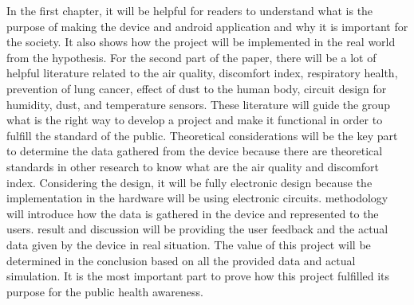 In the first chapter, it will be helpful for readers to understand what is the purpose of making the device and android application and why it is important for the society. It also shows how the project will be implemented in the real world from the hypothesis. For the second part of the paper, there will be a lot of helpful literature related to the air quality, discomfort index, respiratory health, prevention of lung cancer, effect of dust to the human body, circuit design for humidity, dust, and temperature sensors. These literature will guide the group what is the right way to develop a project and make it functional in order to fulfill the standard of the public. Theoretical considerations will be the key part to determine the data gathered from the device because there are theoretical standards in other research to know what are the air quality and discomfort index. Considering the design, it will be fully electronic design because the implementation in the hardware will be using electronic circuits. methodology will introduce how the data is gathered in the device and represented to the users. result and discussion will be providing the user feedback and the actual data given by the device in real situation. The value of this project will be determined in the conclusion based on all the provided data and actual simulation. It is the most important part to prove how this project fulfilled its purpose for the public health awareness.

